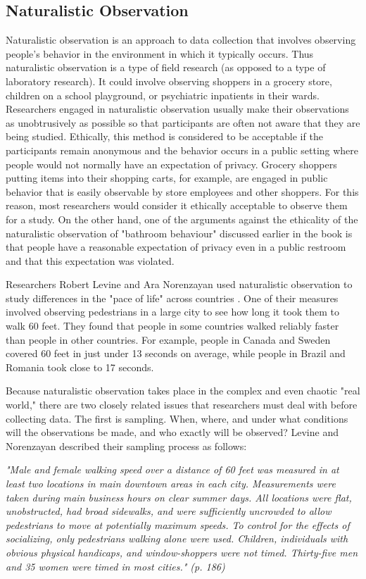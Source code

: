 \subsection{Naturalistic Observation}


Naturalistic observation is an approach to data collection that involves observing people's behavior in the environment in which it typically occurs. Thus naturalistic observation is a type of field research (as opposed to a type of laboratory research). It could involve observing shoppers in a grocery store, children on a school playground, or psychiatric inpatients in their wards. Researchers engaged in naturalistic observation usually make their observations as unobtrusively as possible so that participants are often not aware that they are being studied. Ethically, this method is considered to be acceptable if the participants remain anonymous and the behavior occurs in a public setting where people would not normally have an expectation of privacy. Grocery shoppers putting items into their shopping carts, for example, are engaged in public behavior that is easily observable by store employees and other shoppers. For this reason, most researchers would consider it ethically acceptable to observe them for a study. On the other hand, one of the arguments against the ethicality of the naturalistic observation of "bathroom behaviour" discussed earlier in the book is that people have a reasonable expectation of privacy even in a public restroom and that this expectation was violated.


Researchers Robert Levine and Ara Norenzayan used naturalistic observation to study differences in the "pace of life" across countries \citep{levine_pace_1999}. One of their measures involved observing pedestrians in a large city to see how long it took them to walk 60 feet. They found that people in some countries walked reliably faster than people in other countries. For example, people in Canada and Sweden covered 60 feet in just under 13 seconds on average, while people in Brazil and Romania took close to 17 seconds.


Because naturalistic observation takes place in the complex and even chaotic "real world," there are two closely related issues that researchers must deal with before collecting data. The first is sampling. When, where, and under what conditions will the observations be made, and who exactly will be observed? Levine and Norenzayan described their sampling process as follows:


\emph{"Male and female walking speed over a distance of 60 feet was measured in at least two locations in main downtown areas in each city. Measurements were taken during main business hours on clear summer days. All locations were flat, unobstructed, had broad sidewalks, and were sufficiently uncrowded to allow pedestrians to move at potentially maximum speeds. To control for the effects of socializing, only pedestrians walking alone were used. Children, individuals with obvious physical handicaps, and window-shoppers were not timed. Thirty-five men and 35 women were timed in most cities." (p. 186)}


